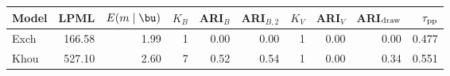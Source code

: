 \begin{tabular}{lrrrrrrrrr}
\hline\hline
Model & LPML & $E(m\mid\bu)$ & $K_B$ & ARI$_B$ & ARI$_{B,2}$ & $K_V$ & ARI$_V$ & ARI$_{\rm draw}$ & $\tau_{\rm pp}$ \\
\hline
Exch & 166.58 & 1.99 & 1 & 0.00 & 0.00 & 1 & 0.00 & 0.00 & 0.477 \\
Khou & 527.10 & 2.60 & 7 & 0.52 & 0.54 & 1 & 0.00 & 0.34 & 0.551 \\
\hline\hline
\end{tabular}

